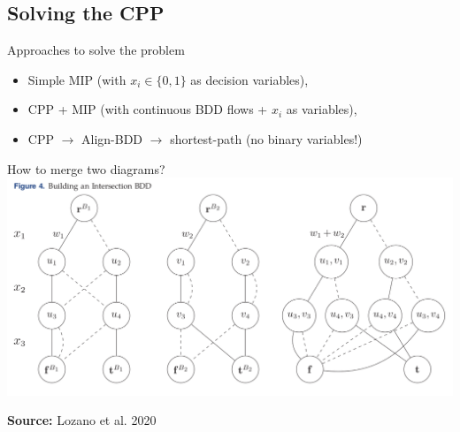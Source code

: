 \documentclass[10pt, xcolor=svgnames]{beamer}
\begin{document}
\subsection{Solving the CPP}
\label{sec:orga5ec10e}
\begin{frame}[label={sec:orgc2c5280}]{Approaches to solve the problem}
\begin{itemize}
\item Simple MIP (with \(x_i\in\{0,1\}\) as decision variables),
\item CPP + MIP (with continuous BDD flows + \(x_i\) as variables),
\item CPP \(\rightarrow\) Align-BDD \(\rightarrow\) shortest-path (no binary variables!)
\end{itemize}
\end{frame}
\begin{frame}[label={sec:org2175567}]{How to merge two diagrams?}
\centering
\includegraphics[width=\textwidth]{./img/merging.png}

{\footnotesize\vspace{2ex}\textbf{Source:} Lozano et al. 2020}
\end{frame}
\end{document}
